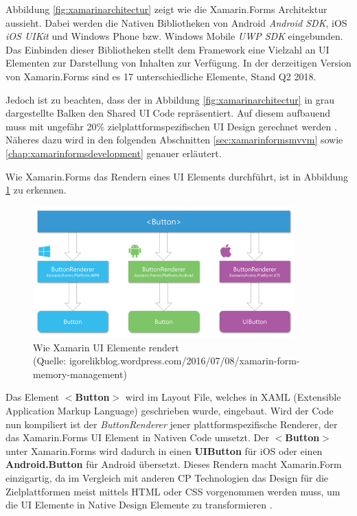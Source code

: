 	Abbildung \ref{fig:xamarinarchitectur} zeigt wie die Xamarin.Forms Architektur aussieht. Dabei werden die Nativen Bibliotheken von Android \textit{Android SDK}, iOS \textit{iOS UIKit} und Windows Phone bzw. Windows Mobile \textit{UWP SDK} eingebunden. Das Einbinden dieser Bibliotheken stellt dem Framework eine Vielzahl an UI Elementen zur Darstellung von Inhalten zur Verfügung. In der derzeitigen Version von Xamarin.Forms sind es 17 unterschiedliche Elemente, Stand Q2 2018.

	Jedoch ist zu beachten, dass der in Abbildung \ref{fig:xamarinarchitectur} in grau dargestellte Balken den Shared UI Code repräsentiert. Auf diesem aufbauend muss mit ungefähr 20\% zielplattformspezifischen UI Design gerechnet werden \cite{book:Xamarin-Mobile-Application-Development}. Näheres dazu wird in den folgenden Abschnitten \ref{sec:xamarinformsmvvm} sowie \ref{chap:xamarinformsdevelopment} genauer erläutert.

	Wie Xamarin.Forms das Rendern eines UI Elements durchführt, ist in Abbildung \ref{fig:xamarinaformsrender} zu erkennen.

	\begin{figure}[h!]
		\centering
		\includegraphics[width=0.9\textwidth]{images/xamarinforms-button-rendering.png}
		\caption[Wie Xamarin UI Elemente rendert]{Wie Xamarin UI Elemente rendert\\\hspace{\textwidth}(Quelle: igorelikblog.wordpress.com/2016/07/08/xamarin-form-memory-management)}
		\label{fig:xamarinaformsrender}
	\end{figure}

	Das Element \textbf{$<$Button$>$} wird im Layout File, welches in XAML (Extensible Application Markup Language) geschrieben wurde, eingebaut. Wird der Code nun kompiliert ist der \textit{ButtonRenderer} jener plattformspezifische Renderer, der das Xamarin.Forms UI Element in Nativen Code umsetzt. Der \textbf{$<$Button$>$} unter Xamarin.Forms wird dadurch in einen \textbf{UIButton} für iOS oder einen \textbf{Android.Button} für Android übersetzt. Dieses Rendern macht Xamarin.Form einzigartig, da im Vergleich mit anderen CP Technologien das Design für die Zielplattformen meist mittels HTML oder CSS vorgenommen werden muss, um die UI Elemente in Native Design Elemente zu transformieren \cite{book:Xamarin-Mobile-Application-Development}.

